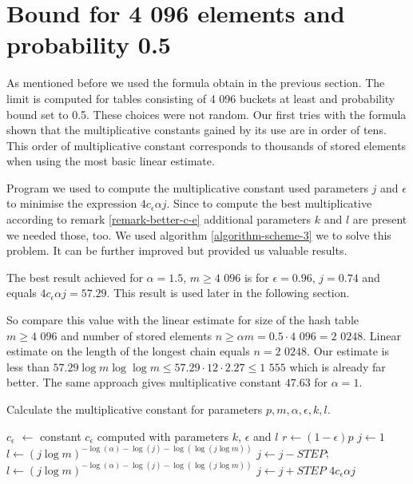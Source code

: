 \section{Bound for 4 096 elements and probability 0.5}
As mentioned before we used the formula obtain in the previous section. The limit is computed for tables consisting of 4 096 buckets at least and probability bound set to 0.5. These choices were not random. Our first tries with the formula shown that the multiplicative constants gained by its use are in order of tens. This order of multiplicative constant corresponds to thousands of stored elements when using the most basic linear estimate.

Program we used to compute the multiplicative constant used parameters $j$ and $\epsilon$ to minimise the expression $4 c_\epsilon \alpha j$. Since to compute the best multiplicative according to remark \ref{remark-better-c-e} additional parameters $k$ and $l$ are present we needed those, too. We used algorithm \ref{algorithm-scheme-3} we to solve this problem. It can be further improved but provided us valuable results.

The best result achieved for $\alpha = 1.5$, $m \geq \text{4 096}$ is for $\epsilon = 0.96$, $j = 0.74$ and equals $4 c_\epsilon \alpha j = 57.29$. This result is used later in the following section.

So compare this value with the linear estimate for size of the hash table $m \geq \text{4 096}$ and number of stored elements $n \geq \alpha m = 0.5 \cdot \text{4 096} = \text{2 0248}$. Linear estimate on the length of the longest chain equals $n = \text{2 0248}$. Our estimate is less than $57.29 \log m \log \log m \leq 57.29 \cdot 12 \cdot 2.27 \leq \text{1 555}$ which is already far better.  The same approach gives multiplicative constant $47.63$ for $\alpha = 1$.

\begin{algorithm}
\caption{Calculate the multiplicative constant for parameters $p, m, \alpha, \epsilon, k, l$.}
\label{procedure-scheme-3}
\begin{algorithmic}
\STATE $c_\epsilon$ $\leftarrow$ constant $c_\epsilon$ computed with parameters $k$, $\epsilon$ and $l$
\STATE $r \leftarrow (1 - \epsilon)p$ 
\STATE $j \leftarrow 1$
\STATE 
{}
\STATE $l \leftarrow (j \log m) ^ {-\log(\alpha) - \log(j) - \log(\log(j \log m))}$
	\STATE $j \leftarrow j - STEP$;
	\STATE $l \leftarrow (j \log m) ^ {-\log(\alpha) - \log(j) - \log(\log(j \log m))}$
\ENDWHILE
\STATE
\STATE $j \leftarrow j + STEP$
\RETURN $4 c_\epsilon \alpha j$
\end{algorithmic}
\end{algorithm}

